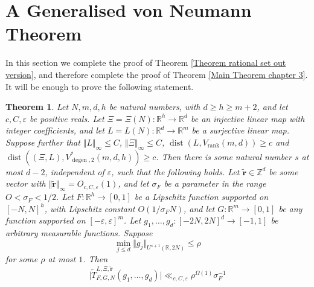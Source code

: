 \documentclass[12pt,a4paper,twoside,reqno]{amsart}
\newtheorem{Theorem}{Theorem}
\newcommand{\degen}{\operatorname{degen}}
\newcommand{\rank}{\operatorname{rank}}
\newcommand{\dist}{\operatorname{dist}}
\numberwithin{equation}{section}
\begin{document}
\section{A Generalised von Neumann Theorem}
\label{section General proof of the real variable von Neumann Theorem}
In this section we complete the proof of Theorem \ref{Theorem rational set out version}, and therefore complete the proof of Theorem \ref{Main Theorem chapter 3}. It will be enough to prove the following statement.
\begin{Theorem}
\label{Theorem Generalised von Neumann Theorem over reals}
Let $N,m,d,h$ be natural numbers, with $d\geqslant h\geqslant m+2$, and let $c,C,\varepsilon$ be positive reals. Let $\Xi = \Xi(N):\mathbb{R}^{h}\longrightarrow \mathbb{R}^d$ be an injective linear map with integer coefficients, and let $L = L(N):\mathbb{R}^d \longrightarrow\mathbb{R}^m$ be a surjective linear map. Suppose further that $\Vert L\Vert_\infty \leqslant C$, $\Vert \Xi\Vert_\infty \leqslant C$, $\dist( L,V_{\rank}(m,d)) \geqslant c$ and $\dist ((\Xi,L), V_{\degen,2}^*(m,d,h))\geqslant c$. Then there is some natural number $s$ at most $d-2$, independent of $\varepsilon$, such that the following holds. Let $\widetilde{\mathbf{r}} \in \mathbb{Z}^d$ be some vector with $\Vert \widetilde{\mathbf{r}}\Vert_\infty = O_{c,C,\varepsilon}(1)$, and let $\sigma_F$ be a parameter in the range $O < \sigma_F < 1/2$. Let $F:\mathbb{R}^h\longrightarrow [0,1]$ be a Lipschitz function supported on $[-N,N]^h$, with Lipschitz constant $O(1/\sigma_FN)$, and let $G:\mathbb{R}^{m} \longrightarrow [0,1]$ be any function supported on $[-\varepsilon, \varepsilon]^m$.  Let $g_1,\dots,g_d:[-2N,2N]^d\longrightarrow [-1,1]$ be arbitrary measurable functions. Suppose \[ \min\limits_{j\leqslant d}\Vert g_j\Vert_{U^{s+1}(\mathbb{R},2N)}\leqslant \rho\] for some $\rho$ at most $1$. Then 
\begin{equation}
\vert \widetilde{T}_{F,G,N}^{L,\Xi,\widetilde{\mathbf{r}}}(g_1,\dots,g_d)\vert\ll_{c,C,\varepsilon} \rho^{\Omega(1)}\sigma_F^{-1} 
\end{equation}
\noindent 
\end{Theorem}
\end{document}
